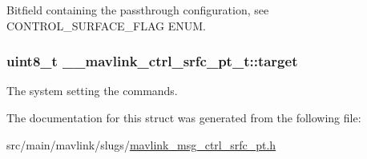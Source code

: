 Bitfield containing the passthrough configuration, see C\+O\+N\+T\+R\+O\+L\+\_\+\+S\+U\+R\+F\+A\+C\+E\+\_\+\+F\+L\+A\+G E\+N\+U\+M. 

\hypertarget{struct____mavlink__ctrl__srfc__pt__t_a8748a29216947621736084640c306161}{
\subsubsection[{target}]{\setlength{\rightskip}{0pt plus 5cm}uint8\+\_\+t \+\_\+\+\_\+mavlink\+\_\+ctrl\+\_\+srfc\+\_\+pt\+\_\+t\+::target}}\label{struct____mavlink__ctrl__srfc__pt__t_a8748a29216947621736084640c306161}


The system setting the commands. 



The documentation for this struct was generated from the following file\+:\begin{DoxyCompactItemize}
\item 
src/main/mavlink/slugs/\hyperlink{mavlink__msg__ctrl__srfc__pt_8h}{mavlink\+\_\+msg\+\_\+ctrl\+\_\+srfc\+\_\+pt.\+h}\end{DoxyCompactItemize}
